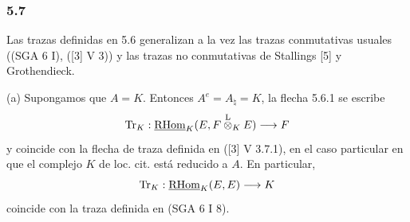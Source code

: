 \subsubsection*{5.7}

Las trazas definidas en 5.6 generalizan a la vez las trazas conmutativas usuales ((SGA 6 I), ([3] V 3)) y las trazas no conmutativas de Stallings [5] y Grothendieck.

(a) Supongamos que $A=K$. Entonces $A^e=A_\natural=K$, la flecha 5.6.1 se escribe
\[
\operatorname{Tr}_K:\underline{\mathrm{RHom}}_K(E,F\overset{\mathrm L}{\otimes}_KE)\longrightarrow F
\]
y coincide con la flecha de traza definida en ([3] V 3.7.1), en el caso particular en que el complejo $K$ de loc. cit. está reducido a $A$. En particular,
\[
\operatorname{Tr}_K:\underline{\mathrm{RHom}}_K(E,E)\longrightarrow K
\]
coincide con la traza definida en (SGA 6 I 8).


